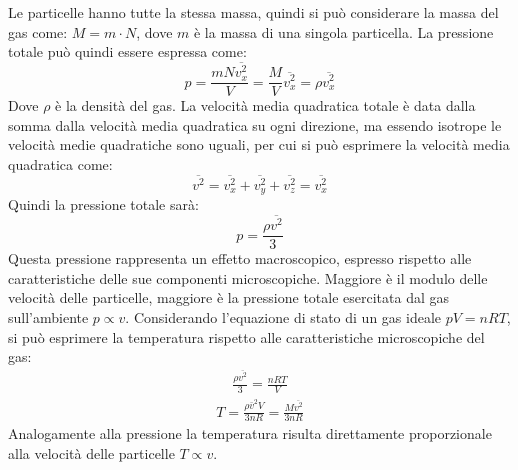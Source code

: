 \documentclass{article}
\numberwithin{equation}{subsection}
\begin{document}
Le particelle hanno tutte la stessa massa, quindi si può 
considerare la massa del gas come: $M=m\cdot N$, dove 
$m$ è la massa di una singola particella.
La pressione totale può quindi essere espressa come:
\begin{equation*}
    p=\displaystyle\frac{mN\overline{v_x^2}}{V}=\frac{M}{V}\overline{v_x^2}=\rho\overline{v_x^2}
\end{equation*}
Dove $\rho$ è la densità del gas. 
La velocità media quadratica totale 
è data dalla somma dalla velocità media quadratica su ogni 
direzione, ma essendo isotrope le velocità medie quadratiche 
sono uguali, per cui si può esprimere la velocità media 
quadratica come:
\begin{equation*}
    \overline{v^2}=\overline{ v_x^2}+\overline{ v_y^2}+\overline{ v_z^2}=\overline{v_x^2}
\end{equation*}
Quindi la pressione totale sarà:
\begin{equation*}
    p=\displaystyle\frac{\rho\overline{ v^2}}{3}
\end{equation*}
Questa pressione rappresenta un effetto macroscopico, espresso 
rispetto alle caratteristiche delle sue componenti microscopiche. 
Maggiore è il modulo delle velocità delle particelle, maggiore 
è la pressione totale esercitata dal gas sull'ambiente $p\propto v$. 
Considerando l'equazione di stato di un gas ideale $pV=nRT$, si può esprimere la temperatura rispetto alle caratteristiche microscopiche del gas: 
\begin{gather*}
    \displaystyle\frac{\rho\overline{ v^2}}{3}=\frac{nRT}{V}
\end{gather*}
\begin{gather}
    T=\displaystyle\frac{\rho\bar v^2 V}{3nR}=\frac{M\overline{ v^2}}{3nR}
\end{gather}
Analogamente alla pressione la temperatura risulta direttamente proporzionale alla velocità delle particelle $T\propto v$. 
\end{document}
